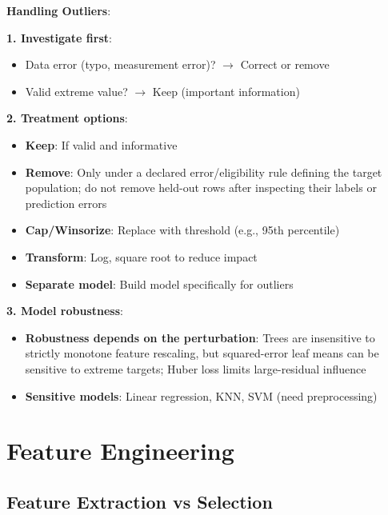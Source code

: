 \documentclass[11pt,twoside]{article}
\numberwithin{equation}{section}
\theoremstyle{plain}
\theoremstyle{definition}
\theoremstyle{remark}
\newenvironment{keyidea}{
  \begin{tcolorbox}[colback=yellow!5!white,
                    colframe=yellow!50!black,
                    title=Key Idea,
                    breakable,
                    enhanced,
                    sharp corners,
                    boxrule=0.8pt,
                    left=6pt, right=6pt, top=6pt, bottom=6pt]
}{
  \end{tcolorbox}
}
\begin{document}
\begin{keyidea}
\textbf{Handling Outliers}:

\textbf{1. Investigate first}:
\begin{itemize}
\item Data error (typo, measurement error)? \ensuremath{\to} Correct or remove
\item Valid extreme value? \ensuremath{\to} Keep (important information)
\end{itemize}

\textbf{2. Treatment options}:
\begin{itemize}
\item \textbf{Keep}: If valid and informative
\item \textbf{Remove}: Only under a declared error/eligibility rule defining the target population; do not remove held-out rows after inspecting their labels or prediction errors
\item \textbf{Cap/Winsorize}: Replace with threshold (e.g., 95th percentile)
\item \textbf{Transform}: Log, square root to reduce impact
\item \textbf{Separate model}: Build model specifically for outliers
\end{itemize}

\textbf{3. Model robustness}:
\begin{itemize}
\item \textbf{Robustness depends on the perturbation}: Trees are insensitive to strictly monotone feature rescaling, but squared-error leaf means can be sensitive to extreme targets; Huber loss limits large-residual influence
\item \textbf{Sensitive models}: Linear regression, KNN, SVM (need preprocessing)
\end{itemize}
\end{keyidea}

\section{Feature Engineering}
\label{sec:feature-engineering}

\subsection{Feature Extraction vs Selection}
\end{document}
